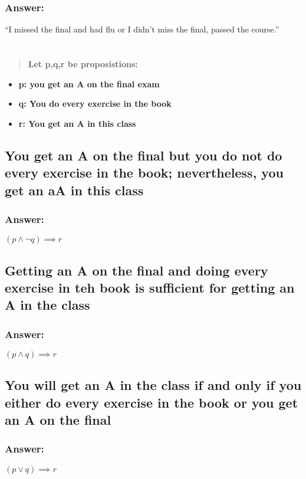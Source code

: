 \documentclass[titlepage]{article}\usepackage[]{graphicx}\usepackage[]{color}
\begin{document}
\subsubsection{Answer:}
``I missed the final and had flu or I didn't miss the final, passed the
course.''


\section{ }
\begin{quote}
  \textbf{Let p,q,r be proposistions:}
\end{quote}

\begin{itemize}
  \item \textbf{p: you get an A on the final exam}
  \item \textbf{q: You do every exercise in the book}
  \item \textbf{r: You get an A in this class}
\end{itemize}
\subsection{You get an A on the final but you do not do every exercise in the
book; nevertheless, you get an aA in this class}
\subsubsection{Answer:}
\( (p \land \lnot q) \implies r \)

\subsection{Getting an A on the final and doing every exercise in teh book is
sufficient for getting an A in the class}
\subsubsection{Answer:}
\( ( p \land q) \implies r \)

\subsection{You will get an A in the class if and only if you either do every
exercise in the book or you get an A on the final}
\subsubsection{Answer:}
$ ( p \lor q) \implies r $
\end{document}

